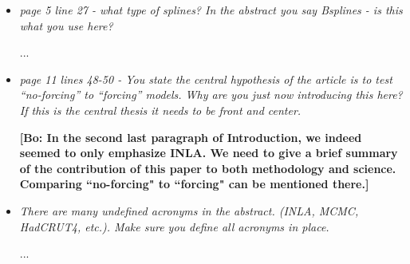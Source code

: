 \documentclass[11pt]{article}
\newcommand{\bl}[1]{\color{red}\textbf{[Bo: #1]}\normalcolor}
\begin{document}
\begin{itemize}
\bl{We agree that the reconstruction in this paper can be performed in full MCMC and any of the R packages you mentioned. Indeed we wrote our own full MCMC sampling code using R in Barboza et al. (2014) for the reconstruction. We also agree that INLA is an approximation method and has limitations, We therefore have a particular section to investigate the effect of INLA approximations. Despite that,  there are two main reasons why we introduce INLA here. One is that INLA allows us to conduct experiments such as comparing different data reduction methods quickly, so we can implement many experiments without computation burden. The other reason is that we hope this work also plays the role of verifying that INLA can be used for climate reconstruction so later we can employ it in the space-time climate reconstruction, as you mentioned. We now have added a brief discussion about the limitation of INLA to the paper.}


\item \textit{page 5 line 27 - what type of splines? In the abstract you say Bsplines - is this what you use here?}

...

\item \textit{page 11 lines 48-50 - You state the central hypothesis of the
    article is to test “no-forcing” to “forcing” models. Why are you just now
    introducing this here? If this is the central thesis it needs to be front
    and center.}

 \bl{In the second last paragraph of Introduction, we indeed seemed to only emphasize INLA. We need to give a brief summary of the contribution of this paper to both methodology and science. Comparing ``no-forcing" to ``forcing" can be mentioned there.}

\item \textit{There are many undefined acronyms in the abstract. (INLA, MCMC,
    HadCRUT4, etc.). Make sure you define all acronyms in place.}

 ... 
\end{itemize}
\end{document}
